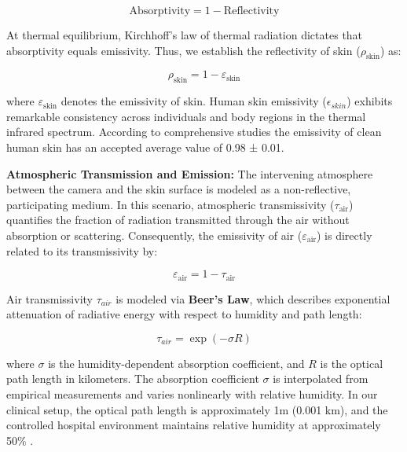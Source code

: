\begin{equation}
  \text{Absorptivity} = 1 - \text{Reflectivity}
\end{equation}

At thermal equilibrium, Kirchhoff's law of thermal radiation dictates that absorptivity equals emissivity. Thus, we establish the reflectivity of skin ($\rho_{\text{skin}}$) as:

\begin{equation}
  \rho_{\text{skin}} = 1 - \varepsilon_{\text{skin}}
\end{equation}

where $\varepsilon_{\text{skin}}$ denotes the emissivity of skin. Human skin emissivity ($\epsilon_{skin}$) exhibits remarkable consistency across individuals and body regions in the thermal infrared spectrum. According to comprehensive studies \citep{bernard2013infrared} the emissivity of clean human skin has an accepted average value of 0.98 ± 0.01.

\vspace{1ex}
\noindent \textbf{Atmospheric Transmission and Emission:} The intervening atmosphere between the camera and the skin surface is modeled as a non-reflective, participating medium. In this scenario, atmospheric transmissivity ($\tau_{\text{air}}$) quantifies the fraction of radiation transmitted through the air without absorption or scattering. Consequently, the emissivity of air ($\varepsilon_{\text{air}}$) is directly related to its transmissivity by:

\begin{equation}
  \varepsilon_{\text{air}} = 1 - \tau_{\text{air}}
\end{equation}

Air transmissivity $\tau_{air}$ is modeled via \textbf{Beer's Law}, which describes exponential attenuation of radiative energy with respect to humidity and path length:

\begin{equation}
  \tau_{air} = \exp(-\sigma R)
\end{equation}

where $\sigma$ is the humidity-dependent absorption coefficient, and $R$ is the optical path length in kilometers. The absorption coefficient $\sigma$ is interpolated from empirical measurements and varies nonlinearly with relative humidity. In our clinical setup, the optical path length is approximately 1m (0.001 km), and the controlled hospital environment maintains relative humidity at approximately 50\% \citep{saran2020heating}.


